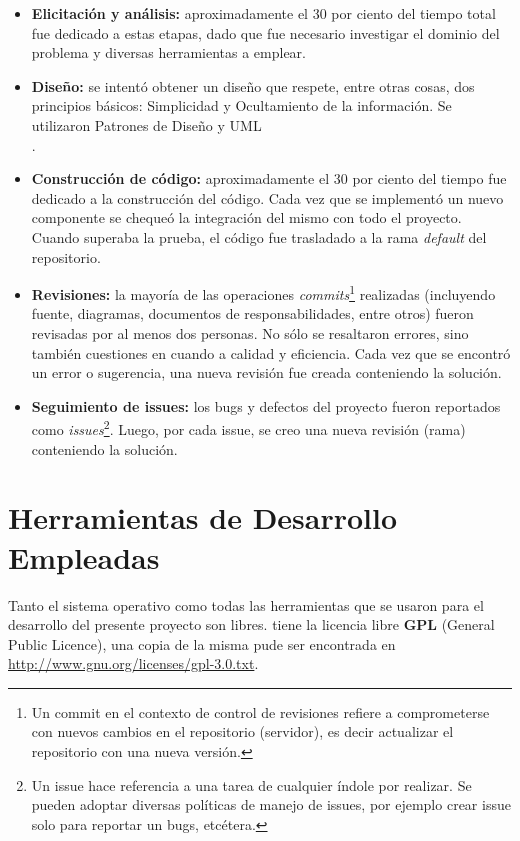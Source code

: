 \begin{itemize}
    \item \textbf{Elicitación y análisis:} aproximadamente el 30 por ciento del tiempo total fue dedicado a estas etapas, dado que fue necesario investigar el dominio del problema y diversas herramientas a emplear.     

    \item \textbf{Diseño:} se intentó obtener un diseño que respete, entre otras cosas, dos principios básicos: Simplicidad y Ocultamiento de la información. Se utilizaron Patrones de Diseño\cite{Gamma} y UML \\ \cite{uml}.

    \item \textbf{Construcción de código:} aproximadamente el 30 por ciento del tiempo fue dedicado a la construcción del código. Cada vez que se implementó un nuevo componente se chequeó la integración del mismo con todo el proyecto. Cuando superaba la prueba, el código fue trasladado a la rama \emph{default} del repositorio.

    \item \textbf{Revisiones:} la mayoría de las operaciones \emph{commits}\footnote{Un commit en el contexto de control de revisiones refiere a comprometerse con nuevos cambios en el repositorio (servidor), es decir actualizar el repositorio con una nueva versión.} realizadas (incluyendo fuente, diagramas, documentos de responsabilidades, entre otros) fueron revisadas por al menos dos personas. No sólo se resaltaron errores, sino también cuestiones en cuando a calidad y eficiencia. Cada vez que se encontró un error o sugerencia, una nueva revisión fue creada conteniendo la solución.

    \item \textbf{Seguimiento de issues:} los bugs y defectos del proyecto fueron reportados como \emph{issues}\footnote{Un issue hace referencia a una tarea de cualquier índole por realizar. Se pueden adoptar diversas políticas de manejo de issues, por ejemplo crear issue solo para reportar un bugs, etcétera.}. Luego, por cada issue, se creo una nueva revisión (rama) conteniendo la solución.
\end{itemize}

\section{Herramientas de Desarrollo Empleadas}
\par Tanto el sistema operativo como todas las herramientas que se usaron para el desarrollo del presente proyecto son libres. \remo tiene la licencia libre \textbf{GPL} (General Public Licence), una copia de la misma pude ser encontrada en \url{http://www.gnu.org/licenses/gpl-3.0.txt}.

